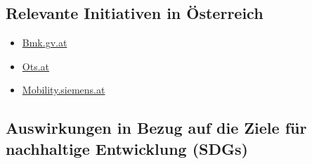 \documentclass[
]{book}
\providecommand{\tightlist}{%
  \setlength{\itemsep}{0pt}\setlength{\parskip}{0pt}}
\begin{document}
\hypertarget{relevante-initiativen-in-uxf6sterreich-12}{%
\subsection*{Relevante Initiativen in Österreich}\label{relevante-initiativen-in-uxf6sterreich-12}}

\begin{itemize}
\tightlist
\item
  \href{https://www.bmk.gv.at/dam/jcr:805487b2-3563-4bd0-8fc6-e392970a42ec/citsstategy.pdf}{Bmk.gv.at}
\item
  \href{https://www.ots.at/presseaussendung/OTS_20201020_OTS0067/asfinag-startet-als-erster-autobahnbetreiber-europas-vernetzung-von-strasse-und-fahrzeug-bild}{Ots.at}
\item
  \href{https://www.mobility.siemens.com/at/de/unternehmen/newsroom/pressemitteilungen/basis-fur-autonomes-fahren-auf-osterreichs-autobahnen.html}{Mobility.siemens.at}
\end{itemize}

\hypertarget{auswirkungen-in-bezug-auf-die-ziele-fuxfcr-nachhaltige-entwicklung-sdgs-12}{%
\subsection*{Auswirkungen in Bezug auf die Ziele für nachhaltige Entwicklung (SDGs)}\label{auswirkungen-in-bezug-auf-die-ziele-fuxfcr-nachhaltige-entwicklung-sdgs-12}}
\end{document}
